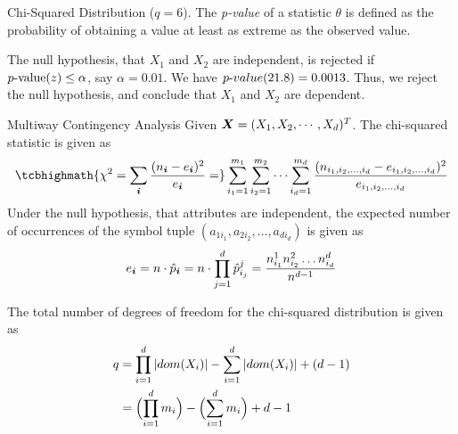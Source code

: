 \begin{frame}{Chi-Squared Distribution ($\textit{q}=6$).}
  \small
  The {\em p-value} of a statistic $\theta$ is defined as
the probability of
obtaining a value at least as extreme as the observed value.

The null hypothesis, that $X_1$ and $X_2$ are independent, is rejected
if $p\hbox{-}\textrm{value}(z) \le \alpha$, say $\alpha=0.01$.
We have ${p\text{-}value}(21.8) = 0.0013$. Thus, we reject the null hypothesis,
and conclude that $X_1$ and $X_2$ are dependent.

\bigskip\bigskip
\centerline{
\normalsize
  }
\end{frame}


\begin{frame}{Multiway Contingency Analysis}
  Given ${\boldsymbol X} = (X_1, X_2, \cdots, X_d)^T$.
The chi-squared statistic is given as
\begin{align*}
\tcbhighmath{
  \chi^2 = \sum_{\bi} \frac{(n_\bi - e_\bi)^2}{e_\bi} =
}
  \sum_{i_1=1}^{m_1} \sum_{i_2=1}^{m_2} \cdots \sum_{i_d=1}^{m_d}
  {(n_{i_1,i_2,\ldots, i_d} - e_{i_1,i_2,\ldots,i_d} )^2 \over
  e_{i_1,i_2,\ldots,i_d}}
\end{align*}
Under the null hypothesis, that attributes are independent, 
the expected number of occurrences
of the symbol tuple $(a_{1i_1}, a_{2i_2}, \dots, a_{d i_d})$
is given as
\begin{align*}
    e_{{\boldsymbol i}} = n \cdot \hat{p}_{{\boldsymbol i}} =
    n \cdot \prod_{j=1}^d \hat{p}^j_{i_{j}} =
    {n^1_{i_1} n^2_{i_2} \dots n^d_{i_d} \over n^{d-1}}
\end{align*}

The total number of degrees of freedom for the chi-squared distribution 
is given as
\begin{align*}
    q & = \prod_{i=1}^d |dom(X_{i})| - \sum_{i=1}^d
    |dom(X_{i})| + (d-1) \notag\\
    & = \Bigl(\prod_{i=1}^d m_i\Bigr) -
    \Bigl(\sum_{i=1}^d m_i\Bigr) + d-1
\end{align*}
\end{frame}



